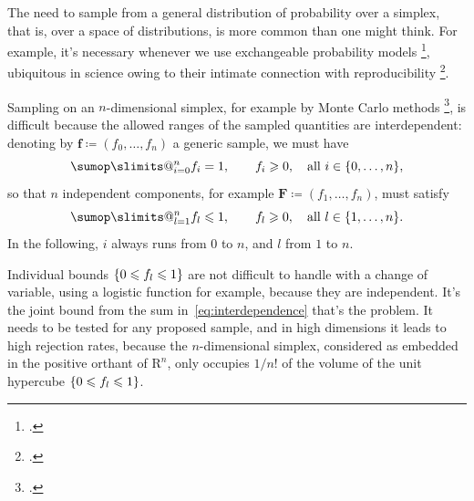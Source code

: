 \documentclass[\ifafour a4paper,12pt,\else a5paper,10pt,\fi%
onecolumn,oneside,article,%
british%
]{memoir}
\makeatletter
\theoremstyle{remark}
\theoremstyle{innote}
\def\sum{\DOTSI\sumop\slimits@}
\newcommand*{\citep}{\footcites}
\newcommand*{\RR}{\bm{\mathrm{R}}}
\newcommand*{\defd}{\coloneqq}
\renewcommand*{\le}{\leqslant}%
\renewcommand*{\ge}{\geqslant}%
\DeclarePairedDelimiter\set{\{}{\}}
\renewcommand*{\|}[1][]{\nonscript\,#1\vert\nonscript\;\mathopen{}}
\newcommand*{\sect}{\S}%
\newcommand*{\sects}{\S\S}%
\newcommand*{\chap}{ch.}%
\newcommand*{\chaps}{chs}%
\newcommand*{\yff}{f}
\newcommand*{\yf}{\bm{\yff}}
\newcommand*{\yfi}{\bm{F}}
\makeatother
\begin{document}
The need to sample from a general distribution of probability over a
simplex, that is, over a space of distributions, is more common than one
might think. For example, it's necessary whenever we use exchangeable
probability models
\citep{dawid2013,definetti1930,definetti1937}[\sect~4.2]{bernardoetal1994_r2000},
ubiquitous in science owing to their intimate connection with
reproducibility \citep[\sects~B.2.15--16]{jcgm1993_r2008}[\sects~3.3.6,
3.3.11]{iso2006b}[\chap~IX]{poincare1902_r1992}[\chap~VI]{duhem1906_r1914}{definetti1937}[\chap~IV]{jeffreys1931_r1973}[\chap~1]{popper1935_t2005}.

Sampling on an $n$-dimensional simplex, for example by Monte Carlo methods
\citep{neal1993}[\chaps~29, 30]{mackay1995_r2003}{hall2014}, is difficult
because the allowed ranges of the sampled quantities are interdependent:
denoting by $\yf\defd(\yff_{0},\dotsc, \yff_{n})$ a generic sample, we must
have
\begin{equation}
  \label{eq:normalization}
  \sum_{i=0}^{n} \yff_{i} =1,\qquad
    \yff_{i} \ge 0, \quad \text{all $i \in \set{0,\dotsc,n}$},
\end{equation}
so that $n$ independent components, for example
$\yfi\defd(\yff_{1},\dotsc,\yff_{n})$, must satisfy
\begin{equation}
  \label{eq:interdependence}
  \sum_{l=1}^{n} \yff_{l} \le 1,\qquad
  \yff_{l} \ge 0, \quad \text{all $l \in \set{1,\dotsc,n}$} .
\end{equation}
In the following, $i$ always runs from $0$ to $n$, and $l$ from $1$ to $n$.

Individual bounds $\set{0 \le \yff_{l} \le 1}$ are not difficult to handle
with a change of variable, using a logistic function for example, because
they are independent. It's the joint bound from the sum
in~\eqref{eq:interdependence} that's the problem. It needs to be tested for
any proposed sample, and in high dimensions it leads to high rejection
rates, because the $n$-dimensional simplex, considered as embedded in the
positive orthant of $\RR^{n}$, only occupies $1/n!$ of the volume of the
unit hypercube $\set{0 \le \yff_{l} \le 1}$.
\end{document}
